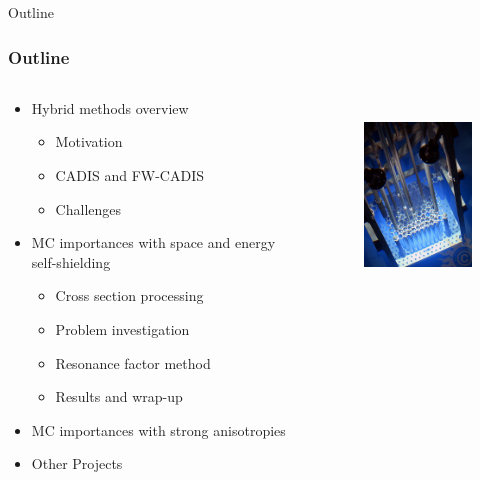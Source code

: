\documentclass[xcolor=x11names,compress, handout]{beamer}
\renewcommand{\(}{\begin{columns}}
\renewcommand{\)}{\end{columns}}
\newcommand{\<}[1]{\begin{column}{#1}}
\renewcommand{\>}{\end{column}}
\begin{document}
\begin{frame}[fragile]{Outline}
  \frametitle{Outline}

\begin{columns}
  \begin{column}{0.6\textwidth}
    \begin{itemize}
    \item Hybrid methods overview
    \begin{itemize}
    		\item Motivation
		\item CADIS and FW-CADIS
		\item Challenges
    \end{itemize}
    	\item MC importances with space and energy self-shielding
	\begin{itemize}
    		\item Cross section processing
		\item Problem investigation
		\item Resonance factor method
		\item Results and wrap-up
  	\end{itemize}
	\item MC importances with strong anisotropies
	\item Other Projects
  \end{itemize}
  \end{column}
  \begin{column}{0.4\textwidth}
  	\begin{figure}
  	\begin{center}
  		\includegraphics[height=2in,clip]{../figs/psu-reactor}
	\end{center}
  	\end{figure}
  \end{column}
\end{columns}

\end{frame}
\end{document}
